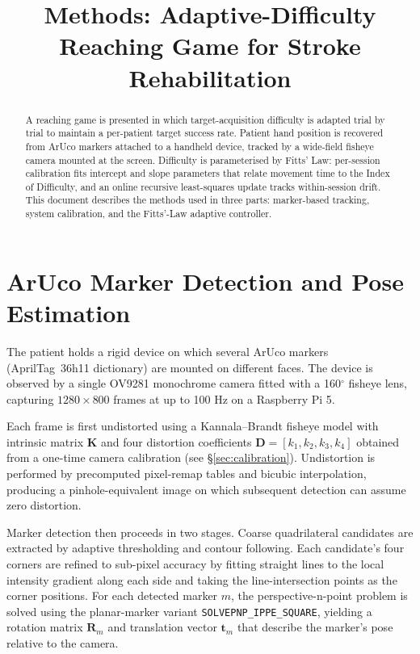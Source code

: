 \documentclass[11pt,a4paper]{article}
\title{Methods: Adaptive-Difficulty Reaching Game for Stroke Rehabilitation}
\author{}
\date{}
\begin{document}
\maketitle

\begin{abstract}
\noindent
A reaching game is presented in which target-acquisition difficulty is adapted trial by trial to maintain a per-patient target success rate. Patient hand position is recovered from ArUco markers attached to a handheld device, tracked by a wide-field fisheye camera mounted at the screen. Difficulty is parameterised by Fitts' Law: per-session calibration fits intercept and slope parameters that relate movement time to the Index of Difficulty, and an online recursive least-squares update tracks within-session drift. This document describes the methods used in three parts: marker-based tracking, system calibration, and the Fitts'-Law adaptive controller.
\end{abstract}

\section{ArUco Marker Detection and Pose Estimation}

The patient holds a rigid device on which several ArUco markers (AprilTag~36h11 dictionary) are mounted on different faces. The device is observed by a single OV9281 monochrome camera fitted with a 160$^\circ$ fisheye lens, capturing $1280 \times 800$ frames at up to 100 Hz on a Raspberry Pi 5.

Each frame is first undistorted using a Kannala--Brandt fisheye model with intrinsic matrix $\mathbf{K}$ and four distortion coefficients $\mathbf{D} = [k_1, k_2, k_3, k_4]$ obtained from a one-time camera calibration (see \S\ref{sec:calibration}). Undistortion is performed by precomputed pixel-remap tables and bicubic interpolation, producing a pinhole-equivalent image on which subsequent detection can assume zero distortion.

Marker detection then proceeds in two stages. Coarse quadrilateral candidates are extracted by adaptive thresholding and contour following. Each candidate's four corners are refined to sub-pixel accuracy by fitting straight lines to the local intensity gradient along each side and taking the line-intersection points as the corner positions. For each detected marker $m$, the perspective-n-point problem is solved using the planar-marker variant \texttt{SOLVEPNP\_IPPE\_SQUARE}, yielding a rotation matrix $\mathbf{R}_m$ and translation vector $\mathbf{t}_m$ that describe the marker's pose relative to the camera.
\end{document}
